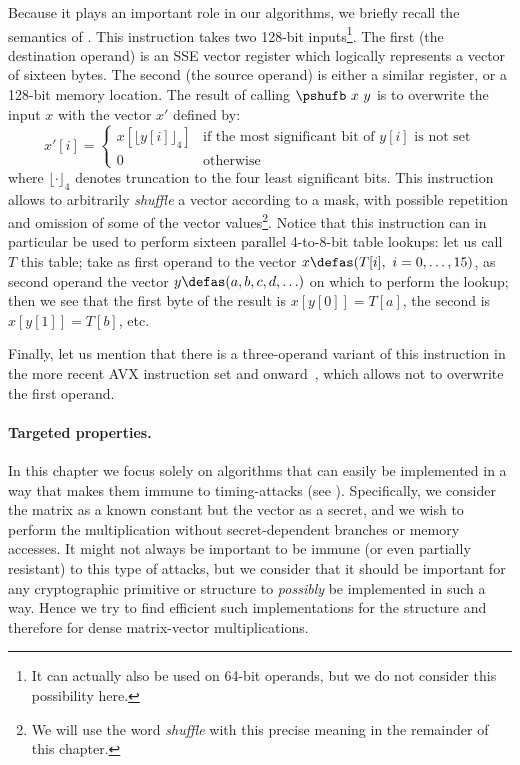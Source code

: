 Because it plays an important role in our algorithms, we briefly recall the semantics of \pshufb{}.
This instruction takes two 128-bit inputs\footnote{It can actually also be used on 64-bit operands, but we do not
consider this possibility here.}. The first (the destination operand) is an \xmm{} SSE vector register which logically represents
a vector of sixteen bytes. The second (the source operand) is either a similar \xmm{} register, or a 128-bit memory location. The result of calling
$\pshufb~x~y$ is to overwrite the input $x$ with the vector $x'$ defined by:
\[
x'[i] = \left\{
				\begin{array}{ll}
				x[\lfloor y[i]\rfloor_4]  & \text{if the most significant bit of $y[i]$ is not set}\\
				0 & \text{otherwise}
				\end{array}
	    \right.
\]
where $\lfloor\cdot\rfloor_4$ denotes truncation to the four least significant bits.
This instruction allows to arbitrarily \emph{shuffle} a vector according to a mask, with possible repetition and omission of some of the vector
values\footnote{We will use the word \emph{shuffle} with this precise meaning in the remainder of this chapter.}.
Notice that this instruction can in particular be used to perform sixteen parallel 4-to-8-bit table lookups: let us call $T$ this table; take
as first operand to \pshufb{} the vector $x \defas (T[i],~i = 0,\ldots,15)$, as second operand the vector
$y \defas (a, b, c, d, \ldots)$
on which to perform the lookup; then we see that the first byte of the result is $x[y[0]] = T[a]$, the second is $x[y[1]] = T[b]$,
etc.

Finally, let us mention that there is a three-operand variant of this instruction in the more recent AVX instruction set and onward~\cite{ia64},
which allows not to overwrite the first operand.


\paragraph{Targeted properties.} In this chapter we focus solely on algorithms that can easily be implemented in a way that makes
them immune to timing-attacks (see \eg \cite{timinattacks}). Specifically, we consider the matrix as a known constant but the vector as a secret, and we wish to perform
the multiplication without secret-dependent branches or memory accesses. It might not always be important to be immune (or even partially resistant) to this type
of attacks, but we consider that it should be important for any cryptographic primitive or structure to \emph{possibly} be implemented in such a way. Hence we try
to find efficient such implementations for the \shark{} structure and therefore for dense matrix-vector multiplications.

